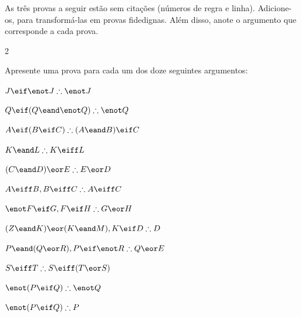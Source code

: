 \problempart
As três provas a seguir estão sem citações (números de regra e linha). Adicione-os, para transformá-las  em provas fidedignas.  Além disso, anote o argumento que corresponde a cada prova.
\begin{multicols}{2}
\begin{fitchproof}
\end{fitchproof}

\begin{fitchproof}
\open
\close
{}%
\end{fitchproof}

\begin{fitchproof}
\open
\close
\open
\close
{}%
\end{fitchproof}
\end{multicols}

\solutions
\problempart
\label{pr.solvedTFLproofs}
Apresente uma prova para cada um dos doze seguintes argumentos:
\begin{earg}
\item $J\eif\enot J \therefore \enot J$
\item $Q\eif(Q\eand\enot Q) \therefore \enot Q$
\item $A\eif (B\eif C) \therefore (A\eand B)\eif C$
\item $K\eand L \therefore K\eiff L$
\item $(C\eand D)\eor E \therefore E\eor D$
\item $A\eiff B, B\eiff C \therefore A\eiff C$
\item $\enot F\eif G, F\eif H \therefore G\eor H$
\item $(Z\eand K) \eor (K\eand M), K \eif D \therefore D$
\item $P \eand (Q\eor R), P\eif \enot R \therefore Q\eor E$
\item $S\eiff T \therefore S\eiff (T\eor S)$
\item $\enot (P \eif Q) \therefore \enot Q$
\item $\enot (P \eif Q) \therefore P$
\end{earg}

